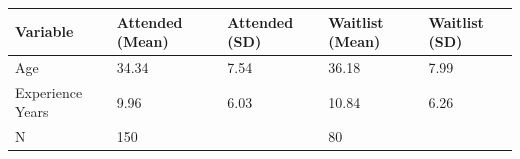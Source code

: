 \begin{tabular}{lllll}
\toprule
        Variable & Attended (Mean) & Attended (SD) & Waitlist (Mean) & Waitlist (SD) \\
\midrule
             Age &           34.34 &          7.54 &           36.18 &          7.99 \\
Experience Years &            9.96 &          6.03 &           10.84 &          6.26 \\
               N &             150 &               &              80 &               \\
\bottomrule
\end{tabular}

